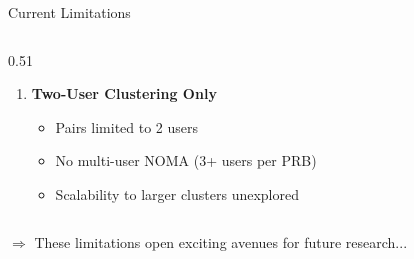\documentclass[aspectratio=169]{beamer}
\begin{document}
\begin{frame}{Current Limitations}
\begin{columns}[T]
\begin{column}{0.51\textwidth}
\begin{enumerate}
                \vspace{0.15cm}
                
                \item \textbf{Two-User Clustering Only}
                \begin{itemize}\itemsep0.05em
                    \item Pairs limited to 2 users
                    \item No multi-user NOMA (3+ users per PRB)
                    \item Scalability to larger clusters unexplored
                \end{itemize}
            \end{enumerate}
        \end{column}
    \end{columns}
    
    \vspace{0.5cm}
    \small \textcolor{iiitblue}{$\Rightarrow$ These limitations open exciting avenues for future research...}
\end{frame}
\end{document}

